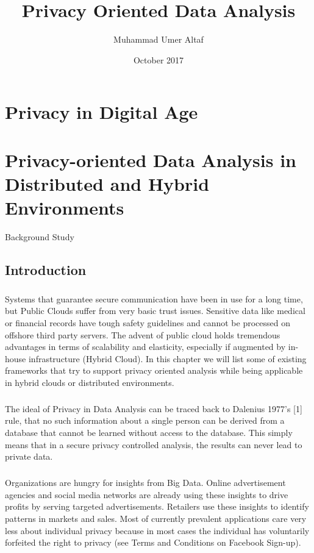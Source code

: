 \documentclass{report}
\title{Privacy Oriented Data Analysis}
\author{Muhammad Umer Altaf }
\date{October 2017}
\begin{document}
\maketitle


\chapter{Privacy in Digital Age}






\chapter{Privacy-oriented Data Analysis in Distributed and Hybrid Environments}{Background Study}
\section{Introduction}
\paragraph{}
Systems that guarantee secure communication have been in use for a long time, but Public Clouds suffer from very basic trust issues. Sensitive data like medical or financial records have tough safety guidelines and cannot be processed on offshore third party servers. The advent of public cloud holds tremendous advantages in terms of scalability and elasticity, especially if augmented by in-house infrastructure (Hybrid Cloud). In this chapter we will list some of existing frameworks that try to support privacy oriented analysis while being applicable in hybrid clouds or distributed environments.
\paragraph{}
The ideal of Privacy in Data Analysis can be traced back to Dalenius 1977’s [1] rule, that no such information about a single person can be derived from a database that cannot be learned without access to the database. This simply means that in a secure privacy controlled analysis, the results can never lead to private data.
\paragraph{}
Organizations are hungry for insights from Big Data. Online advertisement agencies and social media networks are already using these insights to drive profits by serving targeted advertisements. Retailers use these insights to identify patterns in markets and sales. Most of currently prevalent applications care very less about individual privacy because in most cases the individual has voluntarily forfeited the right to privacy (see Terms and Conditions on Facebook Sign-up).
\end{document}
